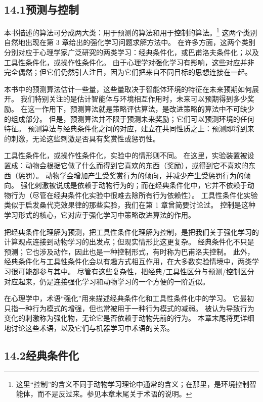 \documentclass[UTF8, 12pt, fontset=fandol, oneside]{ctexart}
\begin{document}
\subsection*{14.1\quad 预测与控制}

本书描述的算法可分成两大类：用于预测的算法和用于控制的算法。\footnote{这里“控制”的含义不同于动物学习理论中通常的含义；在那里，是环境控制智能体，而不是反过来。参见本章末尾关于术语的说明。}
这两个类别自然地出现在第 3 章给出的强化学习问题求解方法中。
在许多方面，这两个类别分别对应于心理学家广泛研究的两类学习：经典条件化，或巴甫洛夫条件化；以及工具性条件化，或操作性条件化。
由于心理学对强化学习有影响，这些对应并非完全偶然；但它们仍然引人注目，因为它们把来自不同目标的思想连接在一起。

本书中的预测算法估计一些量，这些量取决于智能体环境的特征在未来预期如何展开。
我们特别关注的是估计智能体与环境相互作用时，未来可以预期得到多少奖励。
在这一作用下，预测算法就是策略评估算法，是改进策略的算法中不可缺少的组成部分。
但是，预测算法并不限于预测未来奖励；它们可以预测环境的任何特征。
预测算法与经典条件化之间的对应，建立在共同性质之上：预测即将到来的刺激，无论这些刺激是否具有奖赏性或惩罚性。

工具性条件化，或操作性条件化，实验中的情形则不同。
在这里，实验装置被设置成：动物会根据它做了什么而得到它喜欢的东西（奖励），或得到它不喜欢的东西（惩罚）。
动物学会增加产生受奖赏行为的倾向，并减少产生受惩罚行为的倾向。
强化刺激被说成是依赖于动物行为的；而在经典条件化中，它并不依赖于动物行为（尽管在经典条件化实验中很难去除所有行为依赖性）。
工具性条件化实验类似于启发桑代克效果律的那些实验，我们在第 1 章曾简要讨论过。
控制是这种学习形式的核心，它对应于强化学习中策略改进算法的作用。

把经典条件化理解为预测，把工具性条件化理解为控制，是把我们关于强化学习的计算观点连接到动物学习的出发点；但现实情形比这更复杂。
经典条件化不只是预测；它也涉及动作，因此也是一种控制形式，有时称为巴甫洛夫控制。
此外，经典条件化与工具性条件化会以有趣方式相互作用，在大多数实验情境中，两类学习很可能都参与其中。
尽管有这些复杂性，把经典/工具性区分与预测/控制区分对应起来，仍是连接强化学习和动物学习的一个方便的一阶近似。

在心理学中，术语“强化”用来描述经典条件化和工具性条件化中的学习。
它最初只指一种行为模式的增强，但也常被用于一种行为模式的减弱。
被认为导致行为变化的刺激称为强化物，无论它是否依赖于动物先前的行为。
本章末尾将更详细地讨论这些术语，以及它们与机器学习中术语的关系。

\subsection*{14.2\quad 经典条件化}
\end{document}

